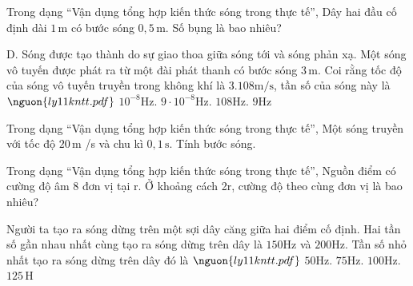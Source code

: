 \begin{ex}
Trong dạng “Vận dụng tổng hợp kiến thức sóng trong thực tế”, Dây hai đầu cố định dài $1\,\text{m}$ có bước sóng $0,5\,\text{m}$. Số bụng là bao nhiêu?
\end{ex}

\begin{ex}
D. Sóng được tạo thành do sự giao thoa giữa sóng tới và sóng phản xạ. Một sóng vô tuyến được phát ra từ một đài phát thanh có bước sóng $3\,\text{m}$. Coi rằng tốc độ của sóng vô tuyến truyền trong không khí là $3.108 \mathrm{m/s}$, tần số của sóng này là $\nguon{ly11 kntt.pdf}$
\choice
{$10^{-8} \mathrm{Hz}.$}
{$9\cdot 10^{-8} \mathrm{Hz}.$}
{\True $108 \mathrm{Hz}$.}
{$9 \mathrm{Hz}$}
\end{ex}

\begin{bt}
Trong dạng “Vận dụng tổng hợp kiến thức sóng trong thực tế”, Một sóng truyền với tốc độ $20\,\text{m}$ /s và chu kì $0,1\,\text{s}$. Tính bước sóng.
\end{bt}

\begin{ex}
Trong dạng “Vận dụng tổng hợp kiến thức sóng trong thực tế”, Nguồn điểm có cường độ âm 8 đơn vị tại r. Ở khoảng cách 2r, cường độ theo cùng đơn vị là bao nhiêu?
\end{ex}

\begin{ex}
Người ta tạo ra sóng dừng trên một sợi dây căng giữa hai điểm cố định. Hai tần số gần nhau nhất cùng tạo ra sóng dừng trên dây là $150 \mathrm{Hz}$ và $200 \mathrm{Hz}$. Tần số nhỏ nhất tạo ra sóng dừng trên dây đó là $\nguon{ly11 kntt.pdf}$
\choice
{\True $50 \mathrm{Hz}$.}
{$75 \mathrm{Hz}$.}
{$100 \mathrm{Hz}$.}
{$125\,\mathrm{H}$}
\end{ex}

